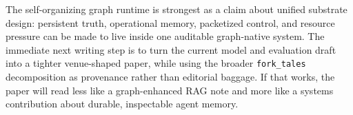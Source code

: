 The self-organizing graph runtime is strongest as a claim about unified substrate design: persistent truth, operational memory, packetized control, and resource pressure can be made to live inside one auditable graph-native system. The immediate next writing step is to turn the current model and evaluation draft into a tighter venue-shaped paper, while using the broader \texttt{fork\_tales} decomposition as provenance rather than editorial baggage. If that works, the paper will read less like a graph-enhanced RAG note and more like a systems contribution about durable, inspectable agent memory.
